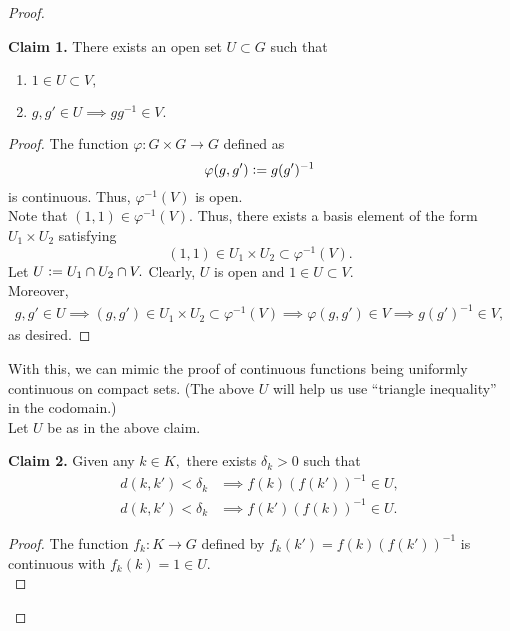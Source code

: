\documentclass[12pt]{article}
\theoremstyle{definition}
\numberwithin{thm}{section}
\newenvironment{blockquote}
{\begin{mdframed}[skipabove=0pt, skipbelow=0pt, innertopmargin=4pt, innerbottommargin=4pt, bottomline=false,topline=false,rightline=false, linewidth=2pt]}
{\end{mdframed}}
\begin{document}
\begin{proof} \phantom{hi}

	\begin{blockquote}
		\textbf{Claim 1.} There exists an open set $U \subset G$ such that
		\begin{enumerate}
			\item $1 \in U \subset V,$
			\item $g, g' \in U \implies gg^{-1} \in V.$
		\end{enumerate}
		\begin{proof} 
			The function $\varphi:G \times G \to G$ defined as
			\begin{equation*} 
				\varphi(g, g') \vcentcolon= g(g')^{-1}
			\end{equation*}
			is continuous. Thus, $\varphi^{-1}(V)$ is open.\\
			Note that $(1, 1) \in \varphi^{-1}(V).$ Thus, there exists a basis element of the form $U_1 \times U_2$ satisfying
			\begin{equation*} 
				(1, 1) \in U_1 \times U_2 \subset \varphi^{-1}(V).
			\end{equation*}
			Let $U\vcentcolon= U_1 \cap U_2 \cap V.$ Clearly, $U$ is open and $1 \in U \subset V.$ \\
			Moreover,
			\begin{align*} 
				g, g' \in U \implies (g, g') \in U_1 \times U_2 \subset \varphi^{-1}(V) \implies \varphi(g, g') \in V \implies g(g')^{-1} \in V,
			\end{align*}
			as desired.
		\end{proof}
	\end{blockquote}
		With this, we can mimic the proof of continuous functions being uniformly continuous on compact sets. (The above $U$ will help us use ``triangle inequality'' in the codomain.)\\
		Let $U$ be as in the above claim.\\
	\begin{blockquote}
		\textbf{Claim 2.} Given any $k \in K,$ there exists $\delta_k > 0$ such that
		\begin{align*} 
			d(k, k') < \delta_k &\implies f(k)(f(k'))^{-1} \in U, \\
			d(k, k') < \delta_k &\implies f(k')(f(k))^{-1} \in U.	
		\end{align*}
		\begin{proof} 
			The function $f_k : K \to G$ defined by $f_k(k') = f(k)(f(k'))^{-1}$ is continuous with $f_k(k) = 1 \in U.$\\

\end{proof}
\end{blockquote}
\end{proof}
\end{document}
